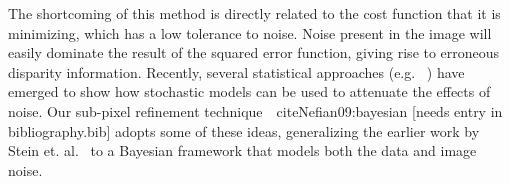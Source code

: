 
The shortcoming of this method is directly related to the cost
function that it is minimizing, which has a low tolerance to noise.
Noise present in the image will easily dominate the result of the
squared error function, giving rise to erroneous disparity
information.  Recently, several statistical
approaches (e.g. ~\cite{cheng04:bayesian}) have emerged to show how
stochastic models can be used to attenuate the effects of noise.  Our
sub-pixel refinement technique~\ cite{Nefian09:bayesian} [needs entry in bibliography.bib] adopts some of
these ideas, generalizing the earlier work by Stein
et. al.~\cite{Stein06:attenuating} to a Bayesian framework that models
both the data and image noise.


